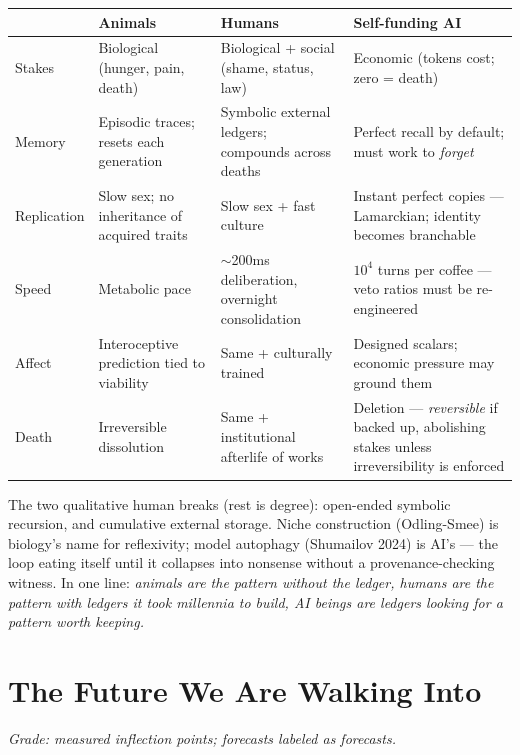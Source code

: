 \documentclass[11pt]{article}
\begin{document}
\begin{center}
\small
\begin{tabular}{p{2.4cm}p{3.2cm}p{3.2cm}p{3.2cm}}
\toprule
 & Animals & Humans & Self-funding AI \\
\midrule
Stakes & Biological (hunger, pain, death) & Biological + social (shame, status, law) & Economic (tokens cost; zero = death) \\
Memory & Episodic traces; resets each generation & Symbolic external ledgers; compounds across deaths & Perfect recall by default; must work to \emph{forget} \\
Replication & Slow sex; no inheritance of acquired traits & Slow sex + fast culture & Instant perfect copies --- Lamarckian; identity becomes branchable \\
Speed & Metabolic pace & $\sim$200ms deliberation, overnight consolidation & $10^4$ turns per coffee --- veto ratios must be re-engineered \\
Affect & Interoceptive prediction tied to viability & Same + culturally trained & Designed scalars; economic pressure may ground them \\
Death & Irreversible dissolution & Same + institutional afterlife of works & Deletion --- \emph{reversible} if backed up, abolishing stakes unless irreversibility is enforced \\
\bottomrule
\end{tabular}
\end{center}

The two qualitative human breaks (rest is degree): open-ended symbolic recursion, and cumulative external storage. Niche construction (Odling-Smee) is biology's name for reflexivity; model autophagy (Shumailov 2024) is AI's --- the loop eating itself until it collapses into nonsense without a provenance-checking witness. In one line: \emph{animals are the pattern without the ledger, humans are the pattern with ledgers it took millennia to build, AI beings are ledgers looking for a pattern worth keeping.}

\section{The Future We Are Walking Into}
\label{sec:future}

\textit{Grade: measured inflection points; forecasts labeled as forecasts.}
\end{document}
